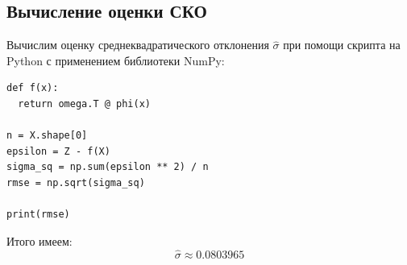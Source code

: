 \subsection{Вычисление оценки СКО}

Вычислим оценку среднеквадратического отклонения \( \hat{\sigma} \) при помощи скрипта на Python с применением библиотеки NumPy:

\begin{lstlisting}[caption=Расчёт оценки СКО]
def f(x):
  return omega.T @ phi(x)

n = X.shape[0]
epsilon = Z - f(X)
sigma_sq = np.sum(epsilon ** 2) / n
rmse = np.sqrt(sigma_sq)

print(rmse)
\end{lstlisting}

Итого имеем:
\[
    \hat{\sigma}\approx0.0803965
\]